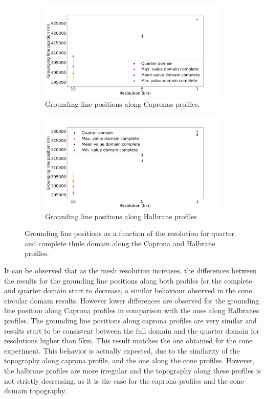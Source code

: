 \documentclass{article}
\begin{document}
\begin{figure}[!h]
	\centering
	\begin{subfigure}{.5\textwidth}
		\centering
		\includegraphics[width=1.1\linewidth]{../fig/Figure_THULE_GLpositions_Capronas.png}
		\caption{Grounding line positions along Capronas profiles.}
		\label{Thule_Capronas}
	\end{subfigure}%
	\begin{subfigure}{.5\textwidth}
		\centering
		\includegraphics[width=1.1\linewidth]{../fig/Figure_THULE_GLpositions_Halbranes.png}
		\caption{Grounding line positions along Halbrane profiles}
		\label{Thule_halbranes}
	\end{subfigure}
	\caption{Grounding line positions as a function of the resolution for quarter and complete thule domain along the Caprona and Halbrane profiles.}
	\label{Grounding_lines__caprona_halbrane_comparison}
\end{figure}

It can be observed that as the mesh resolution increases, the differences between the results for the grounding line positions along both profiles for the complete and quarter domain start to decrease, a similar behaviour observed in the cone circular domain results. However lower differences are observed for the grounding line position along Caprona profiles in comparison with the ones along Halbranes profiles. The grounding line positions along caprona profiles are very similar and results start to be consistent between the full domain and the quarter domain for resolutions higher than 5km. This result matches the one obtained for the cone experiment. This behavior is actually expected, due to the similarity of the topography along caprona profile, and the one along the cone profiles. However, the halbrane profiles are more irregular and the topography along these profiles is not strictly decreasing, as it is the case for the caprona profiles and the cone domain topography. 
\end{document}
